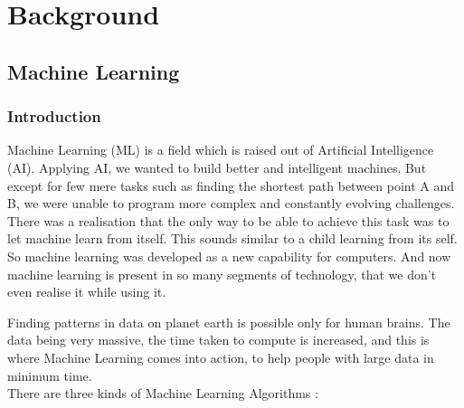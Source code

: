 
 
%  




% 

\chapter{Background}


\section{Machine Learning}

\subsection{Introduction}
Machine Learning (ML) is a field which is raised out of Artificial Intelligence (AI). Applying AI, we wanted to build better and intelligent
machines. But except for few mere tasks such as finding the shortest path between point A and B, we were unable to program more complex
and constantly evolving challenges. There was a realisation that the only way to be able to achieve this task was to let machine learn
from itself. This sounds similar to a child learning from its self. So machine learning was developed as a new capability for computers.
And now machine learning is present in so many segments of technology, that we don’t even realise it while using it. \par
Finding patterns in data on planet earth is possible only for human brains. The data being very massive, the time taken to compute is
increased, and this is where Machine Learning comes into action, to help people with large data in minimum time. \\
There are three kinds of Machine Learning Algorithms :
 
